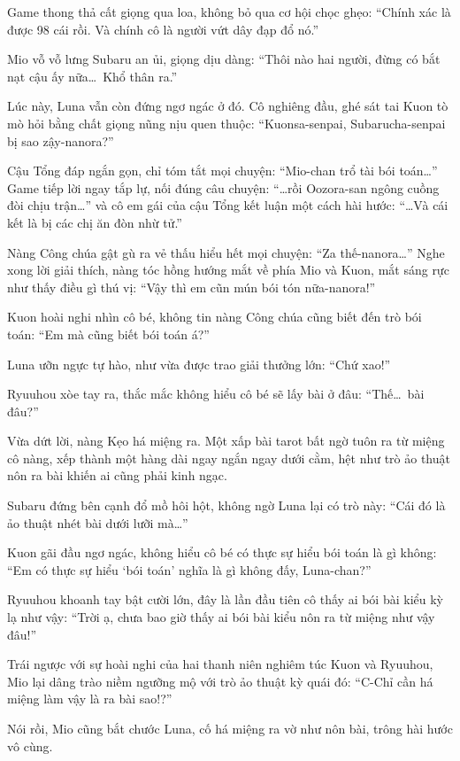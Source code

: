 \documentclass[../main.tex]{subfiles}
\begin{document}
Game thong thả cất giọng qua loa, không bỏ qua cơ hội chọc ghẹo: ``Chính xác là được 98 cái rồi. Và chính cô là người vứt dây đạp đổ nó.''

Mio vỗ vỗ lưng Subaru an ủi, giọng dịu dàng: ``Thôi nào hai người, đừng có bắt nạt cậu ấy nữa\dots\ Khổ thân ra.''

Lúc này, Luna vẫn còn đứng ngơ ngác ở đó. Cô nghiêng đầu, ghé sát tai Kuon tò mò hỏi bằng chất giọng nũng nịu quen thuộc: ``Kuonsa-senpai, Subarucha-senpai bị sao zậy-nanora?''

Cậu Tổng đáp ngắn gọn, chỉ tóm tắt mọi chuyện: ``Mio-chan trổ tài bói toán\dots'' Game tiếp lời ngay tắp lự, nối đúng câu chuyện: ``\dots rồi Oozora-san ngông cuồng đòi chịu trận\dots'' và cô em gái của cậu Tổng kết luận một cách hài hước: ``\dots Và cái kết là bị các chị ăn đòn nhừ tử.''

Nàng Công chúa gật gù ra vẻ thấu hiểu hết mọi chuyện: ``Za thế-nanora\dots'' Nghe xong lời giải thích, nàng tóc hồng hướng mắt về phía Mio và Kuon, mắt sáng rực như thấy điều gì thú vị: ``Vậy thì em cũn mún bói tón nữa-nanora!''

Kuon hoài nghi nhìn cô bé, không tin nàng Công chúa cũng biết đến trò bói toán: ``Em mà cũng biết bói toán á?''

Luna ưỡn ngực tự hào, như vừa được trao giải thưởng lớn: ``Chứ xao!''

Ryuuhou xòe tay ra, thắc mắc không hiểu cô bé sẽ lấy bài ở đâu: ``Thế\dots\ bài đâu?''

Vừa dứt lời, nàng Kẹo há miệng ra. Một xấp bài tarot bất ngờ tuôn ra từ miệng cô nàng, xếp thành một hàng dài ngay ngắn ngay dưới cằm, hệt như trò ảo thuật nôn ra bài khiến ai cũng phải kinh ngạc.

Subaru đứng bên cạnh đổ mồ hôi hột, không ngờ Luna lại có trò này: ``Cái đó là ảo thuật nhét bài dưới lưỡi mà\dots''

Kuon gãi đầu ngơ ngác, không hiểu cô bé có thực sự hiểu bói toán là gì không: ``Em có thực sự hiểu `bói toán' nghĩa là gì không đấy, Luna-chan?''

Ryuuhou khoanh tay bật cười lớn, đây là lần đầu tiên cô thấy ai bói bài kiểu kỳ lạ như vậy: ``Trời ạ, chưa bao giờ thấy ai bói bài kiểu nôn ra từ miệng như vậy đâu!''

Trái ngược với sự hoài nghi của hai thanh niên nghiêm túc Kuon và Ryuuhou, Mio lại dâng trào niềm ngưỡng mộ với trò ảo thuật kỳ quái đó: ``C-Chỉ cần há miệng làm vậy là ra bài sao!?''

Nói rồi, Mio cũng bắt chước Luna, cố há miệng ra vờ như nôn bài, trông hài hước vô cùng.
\end{document}
